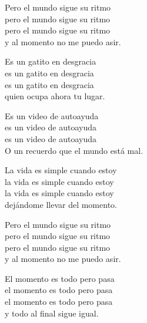 \begin{lyrics}
Pero el mundo sigue su ritmo\\
pero el mundo sigue su ritmo\\
pero el mundo sigue su ritmo\\
y al momento no me puedo asir.

Es un gatito en desgracia\\
es un gatito en desgracia\\
es un gatito en desgracia\\
quien ocupa ahora tu lugar.

Es un video de autoayuda\\
es un video de autoayuda\\
es un video de autoayuda\\
O un recuerdo que el mundo está mal.

La vida es simple cuando estoy\\
la vida es simple cuando estoy\\
la vida es simple cuando estoy\\
dejándome llevar del momento.

Pero el mundo sigue su ritmo\\
pero el mundo sigue su ritmo\\
pero el mundo sigue su ritmo\\
y al momento no me puedo asir.

El momento es todo pero pasa\\
el momento es todo pero pasa\\
el momento es todo pero pasa\\
y todo al final sigue igual.
\end{lyrics}


